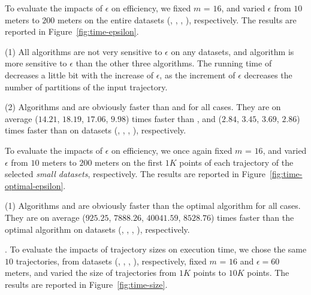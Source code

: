 {%
To evaluate the impacts of $\epsilon$ on efficiency, we fixed $m$ = $16$,
and varied $\epsilon$  from $10$ meters to $200$ meters on the entire
datasets (\sercar, \geolife, \mopsi, \pricar), respectively.
The results are reported in Figure~\ref{fig:time-epsilon}.

\ni(1) All algorithms are not very sensitive to $\epsilon$ on any datasets, and algorithm \dps is more sensitive to $\epsilon$ than the other three algorithms.
The running time of \dps decreases a little bit with the increase of $\epsilon$, as the increment of $\epsilon$ decreases the number of partitions of the input trajectory.


\ni(2) Algorithms \cist and \cista are obviously faster than \dps and \squishe for all cases.
They are on average ($14.21$, $18.19$, $17.06$, $9.98$) times faster than \dps,
and ($2.84$, $3.45$, $3.69$, $2.86$) times faster than \squishe on
{datasets} (\sercar, \geolife, \mopsi, \pricar), respectively.

To evaluate the impacts of $\epsilon$ on efficiency, we once again fixed $m$ = $16$,
and varied $\epsilon$ from $10$ meters to $200$ meters on the first $1K$ points of each trajectory of the selected \textit{small datasets}, respectively.
The results are reported in Figure~\ref{fig:time-optimal-epsilon}.

\ni(1) Algorithms \cist and \cista are obviously faster than the optimal algorithm for all cases.
They are on average ($925.25$, $7888.26$, $40041.59$, $8528.76$) times faster than the optimal algorithm on
datasets (\sercar, \geolife, \mopsi, \pricar), respectively.

.
To evaluate the impacts of trajectory sizes on execution time,
we chose the same {$10$} trajectories, from datasets (\sercar, \geolife, \mopsi, \pricar), respectively,
fixed $m$ = $16$ and $\epsilon = 60$ meters, and varied the size  of trajectories from $1K$ points to $10K$ points.
%
The results are reported in Figure~\ref{fig:time-size}.

}
